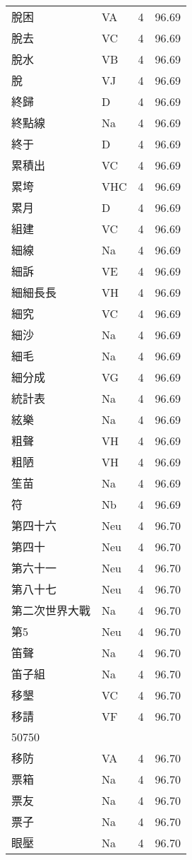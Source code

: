 \documentclass[twocolumn]{book}
\begin{document}
\begin{supertabular}{llrr}
脫困 & VA & 4 &  96.69\\
脫去 & VC & 4 &  96.69\\
脫水 & VB & 4 &  96.69\\
脫 & VJ & 4 &  96.69\\
終歸 & D & 4 &  96.69\\
終點線 & Na & 4 &  96.69\\
終于 & D & 4 &  96.69\\
累積出 & VC & 4 &  96.69\\
累垮 & VHC & 4 &  96.69\\
累月 & D & 4 &  96.69\\
組建 & VC & 4 &  96.69\\
細線 & Na & 4 &  96.69\\
細訴 & VE & 4 &  96.69\\
細細長長 & VH & 4 &  96.69\\
細究 & VC & 4 &  96.69\\
細沙 & Na & 4 &  96.69\\
細毛 & Na & 4 &  96.69\\
細分成 & VG & 4 &  96.69\\
統計表 & Na & 4 &  96.69\\
絃樂 & Na & 4 &  96.69\\
粗聲 & VH & 4 &  96.69\\
粗陋 & VH & 4 &  96.69\\
笙苗 & Na & 4 &  96.69\\
符 & Nb & 4 &  96.69\\
第四十六 & Neu & 4 &  96.70\\
第四十 & Neu & 4 &  96.70\\
第六十一 & Neu & 4 &  96.70\\
第八十七 & Neu & 4 &  96.70\\
第二次世界大戰 & Na & 4 &  96.70\\
第5 & Neu & 4 &  96.70\\
笛聲 & Na & 4 &  96.70\\
笛子組 & Na & 4 &  96.70\\
移墾 & VC & 4 &  96.70\\
移請 & VF & 4 &  96.70\\
50750\\
移防 & VA & 4 &  96.70\\
票箱 & Na & 4 &  96.70\\
票友 & Na & 4 &  96.70\\
票子 & Na & 4 &  96.70\\
眼壓 & Na & 4 &  96.70\\

\end{supertabular}
\end{document}
